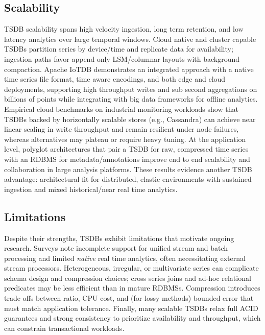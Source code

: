 \subsection{Scalability} TSDB scalability spans high velocity ingestion,
long term retention, and low latency analytics over large temporal windows.
Cloud native and cluster capable TSDBs partition series by device/time and
replicate data for availability; ingestion paths favor append only LSM/columnar
layouts with background compaction. Apache IoTDB demonstrates an integrated
approach with a native time series file format, time aware encodings, and both
edge and cloud deployments, supporting high throughput writes and sub second
aggregations on billions of points while integrating with big data frameworks
for offline analytics\cite{Wang2020}. Empirical cloud benchmarks on industrial
monitoring workloads show that TSDBs backed by horizontally scalable stores
(e.g., Cassandra) can achieve near linear scaling in write throughput and
remain resilient under node failures, whereas alternatives may plateau or
require heavy tuning\cite{Goldschmidt2014}. At the application level, polyglot
architectures that pair a TSDB for raw, compressed time series with an RDBMS
for metadata/annotations improve end to end scalability and collaboration in
large analysis platforms\cite{Duarte2019}. These results evidence another TSDB
advantage: architectural fit for distributed, elastic environments with
sustained ingestion and mixed historical/near real time analytics.

\subsection{Limitations} Despite their strengths, TSDBs exhibit limitations
that motivate ongoing research. Surveys note incomplete support for unified
stream and batch processing and limited \emph{native} real time analytics,
often necessitating external stream processors\cite{Jensen2017,Jensen2022}.
Heterogeneous, irregular, or multivariate series can complicate schema design
and compression choices; cross series joins and ad-hoc relational predicates
may be less efficient than in mature RDBMSs\cite{Jensen2017}. Compression
introduces trade offs between ratio, CPU cost, and (for lossy methods) bounded
error that must match application tolerance\cite{Chiarot2023,Eichinger2015}.
Finally, many scalable TSDBs relax full ACID guarantees and strong consistency
to prioritize availability and throughput, which can constrain transactional
workloads\cite{Jensen2017,Jensen2022}.

